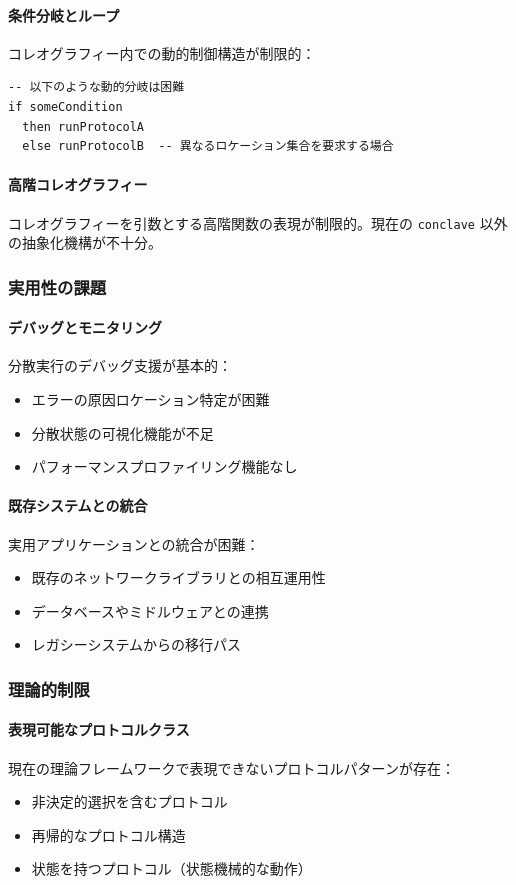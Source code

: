 \paragraph{条件分岐とループ}
コレオグラフィー内での動的制御構造が制限的：
\begin{verbatim}
-- 以下のような動的分岐は困難
if someCondition
  then runProtocolA
  else runProtocolB  -- 異なるロケーション集合を要求する場合
\end{verbatim}

\paragraph{高階コレオグラフィー}
コレオグラフィーを引数とする高階関数の表現が制限的。現在の \texttt{conclave} 以外の抽象化機構が不十分。

\subsubsection{実用性の課題}

\paragraph{デバッグとモニタリング}
分散実行のデバッグ支援が基本的：
\begin{itemize}
\item エラーの原因ロケーション特定が困難
\item 分散状態の可視化機能が不足
\item パフォーマンスプロファイリング機能なし
\end{itemize}

\paragraph{既存システムとの統合}
実用アプリケーションとの統合が困難：
\begin{itemize}
\item 既存のネットワークライブラリとの相互運用性
\item データベースやミドルウェアとの連携
\item レガシーシステムからの移行パス
\end{itemize}

\subsubsection{理論的制限}

\paragraph{表現可能なプロトコルクラス}
現在の理論フレームワークで表現できないプロトコルパターンが存在：
\begin{itemize}
\item 非決定的選択を含むプロトコル
\item 再帰的なプロトコル構造
\item 状態を持つプロトコル（状態機械的な動作）
\end{itemize}

